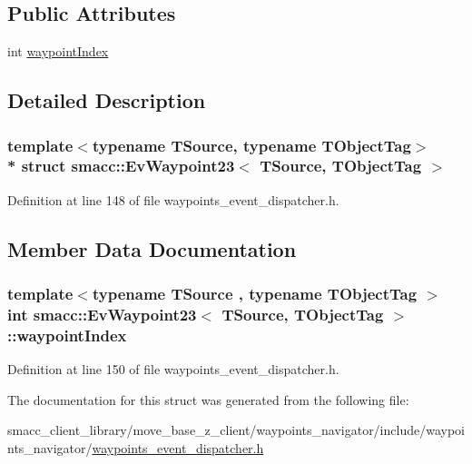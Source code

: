 \subsection*{Public Attributes}
\begin{DoxyCompactItemize}
\item 
int \hyperlink{structsmacc_1_1EvWaypoint23_ad3590233e273b240a26b63f8467ce1b3}{waypoint\+Index}
\end{DoxyCompactItemize}


\subsection{Detailed Description}
\subsubsection*{template$<$typename T\+Source, typename T\+Object\+Tag$>$\\*
struct smacc\+::\+Ev\+Waypoint23$<$ T\+Source, T\+Object\+Tag $>$}



Definition at line 148 of file waypoints\+\_\+event\+\_\+dispatcher.\+h.



\subsection{Member Data Documentation}
\subsubsection[{\texorpdfstring{waypoint\+Index}{waypointIndex}}]{\setlength{\rightskip}{0pt plus 5cm}template$<$typename T\+Source , typename T\+Object\+Tag $>$ int {\bf smacc\+::\+Ev\+Waypoint23}$<$ T\+Source, T\+Object\+Tag $>$\+::waypoint\+Index}\hypertarget{structsmacc_1_1EvWaypoint23_ad3590233e273b240a26b63f8467ce1b3}{}\label{structsmacc_1_1EvWaypoint23_ad3590233e273b240a26b63f8467ce1b3}


Definition at line 150 of file waypoints\+\_\+event\+\_\+dispatcher.\+h.



The documentation for this struct was generated from the following file\+:\begin{DoxyCompactItemize}
\item 
smacc\+\_\+client\+\_\+library/move\+\_\+base\+\_\+z\+\_\+client/waypoints\+\_\+navigator/include/waypoints\+\_\+navigator/\hyperlink{waypoints__event__dispatcher_8h}{waypoints\+\_\+event\+\_\+dispatcher.\+h}\end{DoxyCompactItemize}
